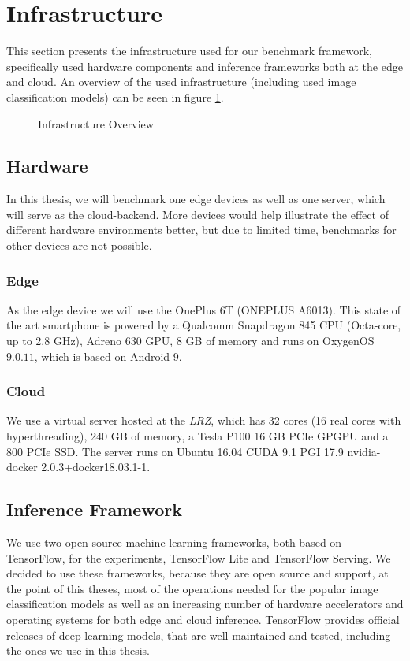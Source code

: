 



\section{Infrastructure}
\label{chap:infrastructure}
This section presents the infrastructure used for our benchmark framework, specifically used hardware components and inference frameworks both at the edge and cloud.
An overview of the used infrastructure (including used image classification models) can be seen in figure \ref{fig:expDesign}.

\begin{figure}[!htb]
\centering
\resizebox{.95\linewidth}{!}{}
\caption{Infrastructure Overview}
\label{fig:expDesign}
\end{figure}


\subsection{Hardware}
In this thesis, we will benchmark one edge devices as well as one server, which will serve as the cloud-backend.
More devices would help illustrate the effect of different hardware environments better, but due to limited time, benchmarks for other devices are not possible.
\subsubsection{Edge}
\label{chap:hardwareEdge}
As the edge device we will use the OnePlus 6T (ONEPLUS A6013). This state of the art smartphone is powered by a Qualcomm Snapdragon 845 CPU (Octa-core, up to $2.8$ GHz), Adreno $630$ GPU, $8$ GB of memory and runs on OxygenOS $9.0.11$, which is based on Android $9$.
\subsubsection{Cloud}
We use a virtual server hosted at the \emph{LRZ}, which has 32 cores (16 real cores with hyperthreading), 240 GB of memory, a Tesla P100 16 GB PCIe GPGPU and a 800 PCIe SSD.
The server runs on Ubuntu 16.04 CUDA 9.1 PGI 17.9 nvidia-docker 2.0.3+docker18.03.1-1.
\subsection{Inference Framework}
We use two open source machine learning frameworks, both based on TensorFlow, for the experiments, TensorFlow Lite and TensorFlow Serving. We decided to use these frameworks, because they are open source and support, at the point of this theses, most of the operations needed for the popular image classification models as well as an increasing number of hardware accelerators and operating systems for both edge and cloud inference.
TensorFlow provides official releases of deep learning models, that are well maintained and tested, including the ones we use in this thesis.

